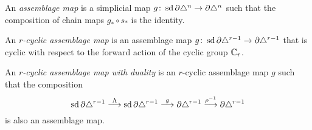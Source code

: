 \begin{definition}
	An \emph{assemblage map} is a simplicial map $g\colon \operatorname{sd} \partial \triangle^n\to \partial \triangle^n$ such that the composition of chain maps $g_*\circ s_*$ is the identity.
\end{definition}
\begin{definition}
	An \emph{$r$-cyclic assemblage map} is an assemblage map $g\colon \operatorname{sd} \partial \triangle^{r-1}\to \partial \triangle^{r-1}$ that is cyclic with respect to the forward action of the cyclic group $\mathbb{C}_{r}$.
\end{definition}
\begin{definition}
	An \emph{$r$-cyclic assemblage map with duality} is an $r$-cyclic assemblage map $g$ such that the composition
	\[\operatorname{sd} \partial \triangle^{r-1} \overset{\Lambda}{\longrightarrow} \operatorname{sd} \partial\triangle^{r-1} \overset{g}{\longrightarrow} \partial\triangle^{r-1}\overset{\rho^{-1}}{\longrightarrow} \partial\triangle^{r-1} \]
	is also an assemblage map.
\end{definition}

